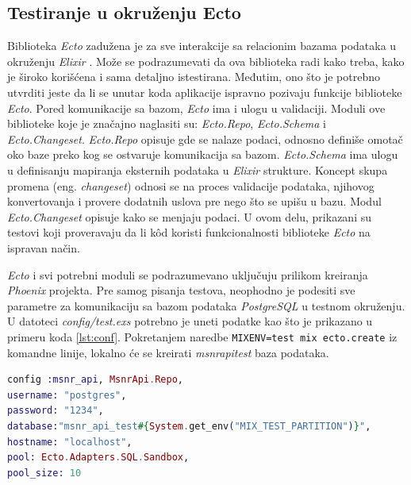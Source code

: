 \documentclass[12pt,oneside]{memoir}
\begin{document}
\subsection{Testiranje u okruženju Ecto}
\par Biblioteka \emph{Ecto} zadužena je za sve interakcije sa relacionim bazama podataka u okruženju \emph{Elixir} \cite{ecto}. Može se podrazumevati da ova biblioteka radi kako treba, kako je široko korišćena i sama detaljno istestirana. Međutim, ono što je potrebno utvrditi jeste da li se unutar koda aplikacije ispravno pozivaju funkcije biblioteke \emph{Ecto}.  Pored komunikacije sa bazom, \emph{Ecto} ima i ulogu u validaciji. Moduli ove biblioteke koje je značajno naglasiti su: \emph{Ecto.Repo}, \emph{Ecto.Schema} i \emph{Ecto.Changeset}. \emph{Ecto.Repo} opisuje gde se nalaze podaci, odnosno definiše omotač oko baze preko kog se ostvaruje komunikacija sa bazom. \emph{Ecto.Schema} ima ulogu u definisanju mapiranja eksternih podataka u \emph{Elixir} strukture. Koncept skupa promena (eng. \emph{changeset}) odnosi se na proces validacije podataka, njihovog konvertovanja i provere dodatnih uslova pre nego što se upišu u bazu. Modul \emph{Ecto.Changeset} opisuje kako se menjaju podaci. U ovom delu, prikazani su testovi koji proveravaju da li k\^{o}d koristi funkcionalnosti biblioteke \emph{Ecto} na ispravan način.
\par \emph{Ecto} i svi potrebni moduli se podrazumevano uključuju prilikom kreiranja \emph{Phoenix} projekta. Pre samog pisanja testova, neophodno je podesiti sve parametre za komunikaciju sa bazom podataka \emph{PostgreSQL} u testnom okruženju. U datoteci \emph{config/test.exs} potrebno je uneti podatke kao što je prikazano u primeru koda \ref{lst:conf}. Pokretanjem naredbe \texttt{MIX{\textunderscore}ENV=test mix ecto.create} iz komandne linije, lokalno će se kreirati \emph{msnr{\textunderscore}api{\textunderscore}test} baza podataka.  \\

\begin{minipage}{\linewidth}
\begin{lstlisting}[language=elixir, basicstyle=\small, caption={Konfiguracija baze podataka u testnom okruženju},captionpos=b, label={lst:conf}]
config :msnr_api, MsnrApi.Repo,
username: "postgres",
password: "1234",
database:"msnr_api_test#{System.get_env("MIX_TEST_PARTITION")}",
hostname: "localhost",
pool: Ecto.Adapters.SQL.Sandbox,
pool_size: 10
\end{lstlisting}
\end{minipage}
\end{document}
